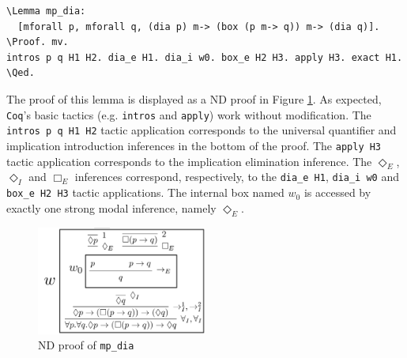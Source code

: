 \documentclass{llncs}
\newcommand{\imp}{\rightarrow}
\newcommand{\all}{\forall}
\newcommand{\nec}{\Box} %
\newcommand{\pos}{\Diamond} %
\newcommand{\red}[1]{\textcolor[rgb]{1,0,0}{#1}}
\newcommand{\blue}[1]{\textcolor[rgb]{0,0,1}{#1}}
\newcommand{\Lemma}{\red{Lemma}}
\newcommand{\Proof}{\blue{Proof}}
\newcommand{\Qed}{\blue{Qed}}
\newcommand{\Coq}{\texttt{Coq}\xspace}
\begin{document}
\begin{Verbatim}[commandchars=\\\{\},fontsize=\verbsize]
\Lemma mp_dia: 
  [mforall p, mforall q, (dia p) m-> (box (p m-> q)) m-> (dia q)].
\Proof. mv. 
intros p q H1 H2. dia_e H1. dia_i w0. box_e H2 H3. apply H3. exact H1. 
\Qed.
\end{Verbatim}




\noindent 
The proof of this lemma is displayed as a ND
proof in  Figure \ref{fig:mp_dia}. As expected, \Coq's basic tactics
(e.g. \texttt{intros} and \texttt{apply}) work without modification.
The \texttt{intros p q H1 H2} tactic application corresponds to the
universal quantifier  and implication introduction inferences in the
bottom of the proof.  The \texttt{apply H3} tactic application
corresponds to the implication  elimination inference. The $\pos_E$,
$\pos_I$ and $\nec_E$ inferences correspond, respectively, to the
\texttt{dia\_e H1},  \texttt{dia\_i w0} and \texttt{box\_e H2 H3}
tactic applications.  The internal box named $w_0$ is accessed by
exactly one strong  modal inference, namely $\pos_E$.

\begin{figure}[H]
\centering
\includegraphics[width=0.5\textwidth]{ND-(mp_dia).png}
\caption{ND proof of \texttt{mp\_dia}\label{fig:mp_dia}}
\end{figure}
\end{document}
